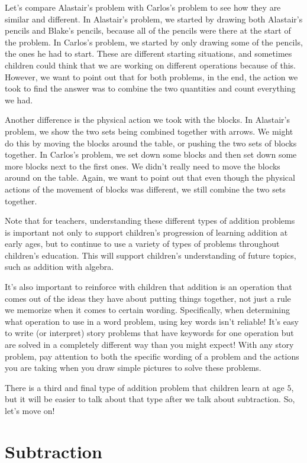 \documentclass{ximera}
\begin{document}
Let's compare Alastair's problem with Carlos's problem to see how they are similar and different. In Alastair's problem, we started by drawing both Alastair's pencils and Blake's pencils, because all of the pencils were there at the start of the problem. In Carlos's problem, we started by only drawing some of the pencils, the ones he had to start. These are different starting situations, and sometimes children could think that we are working on different operations because of this. However, we want to point out that for both problems, in the end, the action we took to find the answer was to combine the two quantities and count everything we had. 

Another difference is the physical action we took with the blocks. In Alastair's problem, we show the two sets being combined together with arrows. We might do this by moving the blocks around the table, or pushing the two sets of blocks together. In Carlos's problem, we set down some blocks and then set down some more blocks next to the first ones. We didn't really need to move the blocks around on the table. Again, we want to point out that even though the physical actions of the movement of blocks was different, we still combine the two sets together.

Note that for teachers, understanding these different types of addition problems is important not only to support children's progression of learning addition at early ages, but to continue to use a variety of types of problems throughout children's education. This will support children's understanding of future topics, such as addition with algebra.

It's also important to reinforce with children that addition is an operation that comes out of the ideas they have about putting things together, not just a rule we memorize when it comes to certain wording. Specifically, when determining what operation to use in a word problem, using key words isn't reliable! It's easy to write (or interpret) story problems that have keywords for one operation but are solved in a completely different way than you might expect! With any story problem, pay attention to both the specific wording of a problem and the actions you are taking when you draw simple pictures to solve these problems.

There is a third and final type of addition problem that children learn at age $5$, but it will be easier to talk about that type after we talk about subtraction. So, let's move on!


\section{Subtraction}
\end{document}
